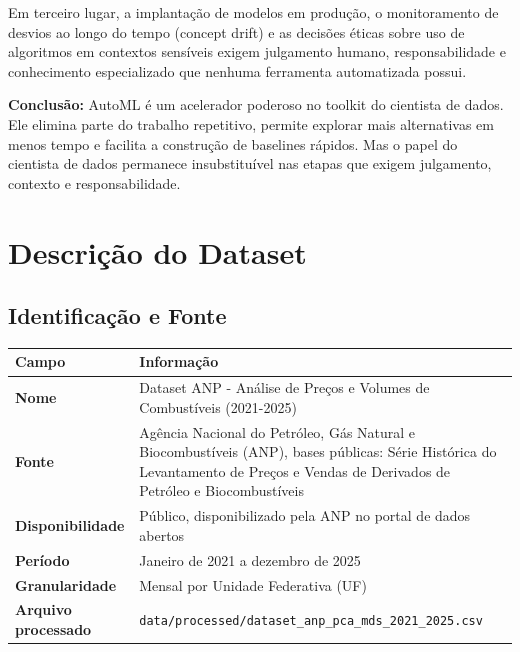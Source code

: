 \documentclass[11pt, a4paper, oneside]{article}
\newcommand{\taltrow}{\rowcolor{tablealt}}
\begin{document}
Em terceiro lugar, a implantação de modelos em produção, o monitoramento de desvios
ao longo do tempo (concept drift) e as decisões éticas sobre uso de algoritmos em
contextos sensíveis exigem julgamento humano, responsabilidade e conhecimento
especializado que nenhuma ferramenta automatizada possui.

\begin{infobox}
\textbf{Conclusão:} AutoML é um acelerador poderoso no toolkit do cientista de dados.
Ele elimina parte do trabalho repetitivo, permite explorar mais alternativas em menos
tempo e facilita a construção de baselines rápidos. Mas o papel do cientista de dados
permanece insubstituível nas etapas que exigem julgamento, contexto e responsabilidade.
\end{infobox}

\newpage

\section{Descrição do Dataset}
\label{sec:dataset}

\subsection{Identificação e Fonte}
\label{sec:dataset-fonte}

\begin{tabularx}{\textwidth}{@{}L{4.5cm} Y@{}}
  \toprule
  \textbf{Campo} & \textbf{Informação} \\
  \midrule
  \taltrow \textbf{Nome} & Dataset ANP - Análise de Preços e Volumes de Combustíveis (2021-2025) \\
  \textbf{Fonte} & Agência Nacional do Petróleo, Gás Natural e Biocombustíveis (ANP), bases públicas: Série Histórica do Levantamento de Preços e Vendas de Derivados de Petróleo e Biocombustíveis \\
  \taltrow \textbf{Disponibilidade} & Público, disponibilizado pela ANP no portal de dados abertos \\
  \textbf{Período} & Janeiro de 2021 a dezembro de 2025 \\
  \taltrow \textbf{Granularidade} & Mensal por Unidade Federativa (UF) \\
  \textbf{Arquivo processado} & \texttt{data/processed/dataset\_anp\_pca\_mds\_2021\_2025.csv} \\
  \bottomrule
\end{tabularx}
\end{document}
